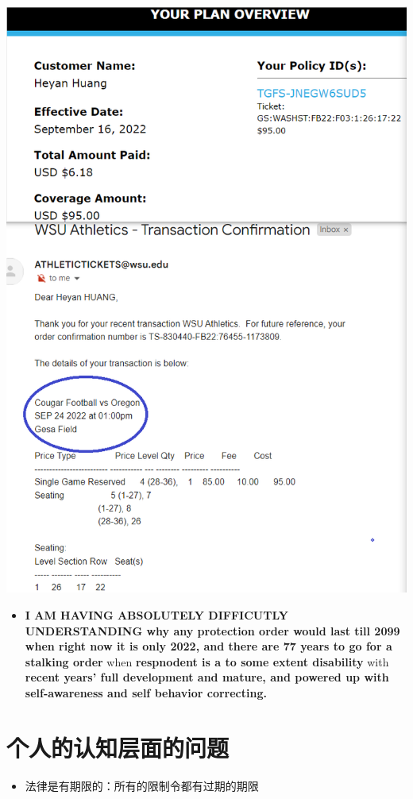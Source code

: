 \documentclass[9pt, b5paper]{article}
\begin{document}
\includegraphics[width=.9\linewidth]{./pic/dearCousin_20220919_221744.png}
\begin{itemize}
\item \textbf{I AM HAVING ABSOLUTELY DIFFICUTLY UNDERSTANDING why any protection order would last till 2099 when right now it is only 2022, and there are 77 years to go for a stalking order} when \textbf{respnodent is a to some extent disability} with \textbf{recent years' full development and mature, and powered up with self-awareness and self behavior correcting.}
\end{itemize}
\section{个人的认知层面的问题　　}
\label{sec-7}
\begin{itemize}
\item 法律是有期限的：所有的限制令都有过期的期限
\end{itemize}
\end{document}
